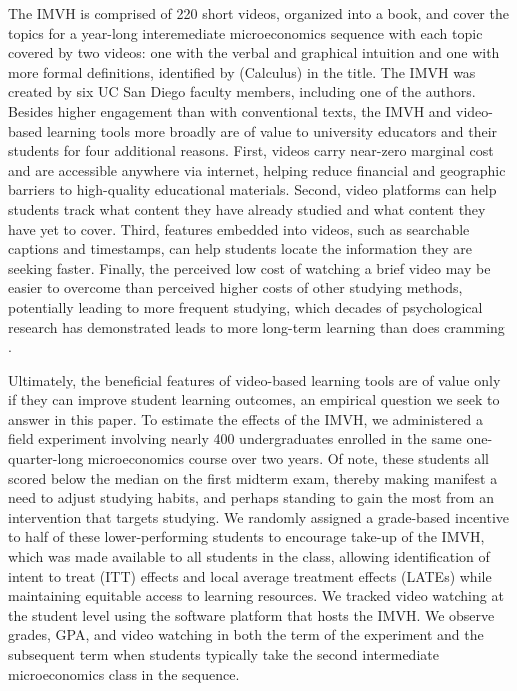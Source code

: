 \documentclass[12pt]{article}
\begin{document}
The IMVH is comprised of 220 short videos, organized into a book, and cover the topics for a year-long interemediate microeconomics sequence with each topic covered by two videos: one with the verbal and graphical intuition and one with more formal definitions, identified by (Calculus) in the title. The IMVH was created by six UC San Diego faculty members, including one of the authors. Besides higher engagement than with conventional texts, the IMVH and video-based learning tools more broadly are of value to university educators and their students for four additional reasons. First, videos carry near-zero marginal cost and are accessible anywhere via internet, helping reduce financial and geographic barriers to high-quality educational materials. Second, video platforms can help students track what content they have already studied and what content they have yet to cover. Third, features embedded into videos, such as searchable captions and timestamps, can help students locate the information they are seeking faster. Finally, the perceived low cost of watching a brief video may be easier to overcome than perceived higher costs of other studying methods, potentially leading to more frequent studying, which decades of psychological research has demonstrated leads to more long-term learning than does cramming \parencite{kornell2009, cpvw2006}.

Ultimately, the beneficial features of video-based learning tools are of value only if they can improve student learning outcomes, an empirical question we seek to answer in this paper. To estimate the effects of the IMVH, we administered a field experiment involving nearly 400 undergraduates enrolled in the same one-quarter-long microeconomics course over two years. Of note, these students all scored below the median on the first midterm exam, thereby making manifest a need to adjust studying habits, and perhaps standing to gain the most from an intervention that targets studying. We randomly assigned a grade-based incentive to half of these lower-performing students to encourage take-up of the IMVH, which was made available to all students in the class, allowing identification of intent to treat (ITT) effects and local average treatment effects (LATEs) while maintaining equitable access to learning resources. We tracked video watching at the student level using the software platform that hosts the IMVH. We observe grades, GPA, and video watching in both the term of the experiment and the subsequent term when students typically take the second intermediate microeconomics class in the sequence.
\end{document}
